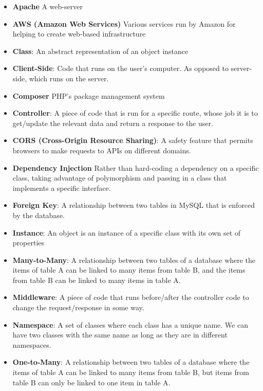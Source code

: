 \begin{itemize}[leftmargin=*]
    \item
        \textbf{Apache}
        A web-server
    \item
        \textbf{AWS (Amazon Web Services)}
        Various services run by Amazon for helping to create web-based infrastructure
    \item
        \textbf{Class}:
        An abstract representation of an object instance
    \item
        \textbf{Client-Side}:
        Code that runs on the user's computer. As opposed to server-side, which runs on the server.
    \item
        \textbf{Composer}
        PHP's package management system
    \item
        \textbf{Controller}:
        A piece of code that is run for a specific route, whose job it is to get/update the relevant data and return a response to the user.
    \item
        \textbf{CORS (Cross-Origin Resource Sharing)}:
        A safety feature that permits browsers to make requests to APIs on different domains.
    \item
        \textbf{Dependency Injection}
        Rather than hard-coding a dependency on a specific class, taking advantage of polymorphism and passing in a class that implements a specific interface.
    \item
        \textbf{Foreign Key}:
        A relationship between two tables in MySQL that is enforced by the database.
    \item
        \textbf{Instance}:
        An object is an instance of a specific class with its own set of properties
    \item
        \textbf{Many-to-Many}:
        A relationship between two tables of a database where the items of table A can be linked to many items from table B, and the items from table B can be linked to many items in table A.
    \item
        \textbf{Middleware}:
        A piece of code that runs before/after the controller code to change the request/response in some way.
    \item
        \textbf{Namespace}:
        A set of classes where each class has a unique name. We can have two classes with the same name as long as they are in different namespaces.
    \item
        \textbf{One-to-Many}:
        A relationship between two tables of a database where the items of table A can be linked to many items from table B, but items from table B can only be linked to one item in table A.

\end{itemize}
